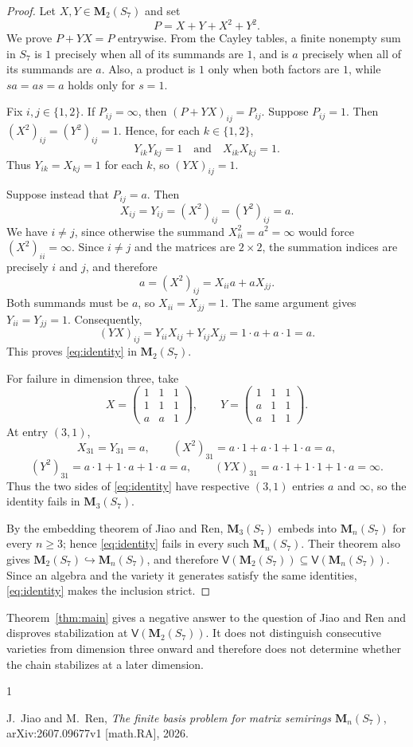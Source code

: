 \documentclass[11pt]{amsart}
\newcommand{\M}{\mathbf{M}}
\newcommand{\V}{\mathsf{V}}
\begin{document}
\begin{proof}
Let $X,Y\in\M_2(S_7)$ and set
\[
 P=X+Y+X^2+Y^2.
\]
We prove $P+YX=P$ entrywise. From the Cayley tables, a finite nonempty
sum in $S_7$ is $1$ precisely when all of its summands are $1$, and is
$a$ precisely when all of its summands are $a$. Also, a product is $1$
only when both factors are $1$, while $sa=as=a$ holds only for $s=1$.

Fix $i,j\in\{1,2\}$. If $P_{ij}=\infty$, then
$(P+YX)_{ij}=P_{ij}$. Suppose $P_{ij}=1$. Then
$(X^2)_{ij}=(Y^2)_{ij}=1$. Hence, for each $k\in\{1,2\}$,
\[
 Y_{ik}Y_{kj}=1
 \quad\text{and}\quad
 X_{ik}X_{kj}=1.
\]
Thus $Y_{ik}=X_{kj}=1$ for each $k$, so $(YX)_{ij}=1$.

Suppose instead that $P_{ij}=a$. Then
\[
 X_{ij}=Y_{ij}=(X^2)_{ij}=(Y^2)_{ij}=a.
\]
We have $i\neq j$, since otherwise the summand
$X_{ii}^2=a^2=\infty$ would force $(X^2)_{ii}=\infty$.
Since $i\neq j$ and the matrices are $2\times2$, the summation indices
are precisely $i$ and $j$, and therefore
\[
 a=(X^2)_{ij}=X_{ii}a+aX_{jj}.
\]
Both summands must be $a$, so $X_{ii}=X_{jj}=1$. The same argument gives
$Y_{ii}=Y_{jj}=1$. Consequently,
\[
 (YX)_{ij}=Y_{ii}X_{ij}+Y_{ij}X_{jj}=1\cdot a+a\cdot1=a.
\]
This proves \eqref{eq:identity} in $\M_2(S_7)$.

For failure in dimension three, take
\[
 X=\begin{pmatrix}
 1&1&1\\
 1&1&1\\
 a&a&1
 \end{pmatrix},
 \qquad
 Y=\begin{pmatrix}
 1&1&1\\
 a&1&1\\
 a&1&1
 \end{pmatrix}.
\]
At entry $(3,1)$,
\[
 X_{31}=Y_{31}=a,
 \qquad
 (X^2)_{31}=a\cdot1+a\cdot1+1\cdot a=a,
\]
\[
 (Y^2)_{31}=a\cdot1+1\cdot a+1\cdot a=a,
 \qquad
 (YX)_{31}=a\cdot1+1\cdot1+1\cdot a=\infty.
\]
Thus the two sides of \eqref{eq:identity} have respective $(3,1)$ entries
$a$ and $\infty$, so the identity fails in $\M_3(S_7)$.

By the embedding theorem of Jiao and Ren,
$\M_3(S_7)$ embeds into $\M_n(S_7)$ for every $n\geq 3$; hence
\eqref{eq:identity} fails in every such $\M_n(S_7)$. Their theorem also
gives $\M_2(S_7)\hookrightarrow\M_n(S_7)$, and therefore
$\V(\M_2(S_7))\subseteq\V(\M_n(S_7))$. Since an algebra and the variety
it generates satisfy the same identities, \eqref{eq:identity} makes the
inclusion strict.
\end{proof}

Theorem~\ref{thm:main} gives a negative answer to the question of Jiao and
Ren and disproves stabilization at $\V(\M_2(S_7))$. It does not distinguish
consecutive varieties from dimension three onward and therefore does not
determine whether the chain stabilizes at a later dimension.

\begin{thebibliography}{1}

J.~Jiao and M.~Ren,
\emph{The finite basis problem for matrix semirings $\M_n(S_7)$},
arXiv:2607.09677v1 [math.RA], 2026.

\end{thebibliography}
\end{document}
